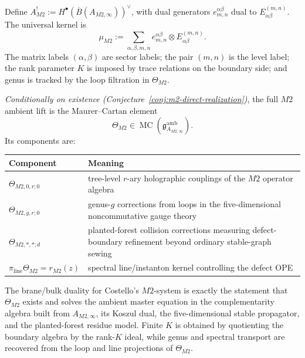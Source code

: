 \begin{definition}
\label{def:m2-koszul-dual}
Define
$A^!_{M2} := H^\bullet(\overline{B}(A_{M2,\infty}))^{\vee}$,
with dual generators $e^{\alpha\beta}_{m,n}$ dual to
$E^{(m,n)}_{\alpha\beta}$. The universal kernel is
\begin{equation}
\label{eq:m2-universal-kernel}
\mu_{M2}
:=
\sum_{\alpha,\beta,m,n}
e^{\alpha\beta}_{m,n} \otimes E^{(m,n)}_{\alpha\beta}.
\end{equation}
The matrix labels $(\alpha,\beta)$ are sector labels; the pair
$(m,n)$ is the level label; the rank parameter $K$ is imposed by
trace relations on the boundary side; and genus is tracked by the
loop filtration in $\Theta_{M2}$.
\end{definition}

\begin{definition}
\label{def:m2-master-lift}
\emph{Conditionally on existence (Conjecture~\ref{conj:m2-direct-realization})}, the full $M2$ ambient lift is the Maurer--Cartan element
\[
\Theta_{M2}
\in
\operatorname{MC}(\mathfrak{g}^{\mathrm{amb}}_{A_{M2,\infty}}).
\]
Its components are:
\begin{center}
\begin{tabular}{@{}p{}p{}@{}}
\toprule
Component & Meaning \\
\midrule
$\Theta_{M2,0,r;0}$ & tree-level $r$-ary holographic
couplings of the $M2$ operator algebra \\
$\Theta_{M2,g,r;0}$ & genus-$g$ corrections from loops in
the five-dimensional noncommutative gauge theory \\
$\Theta_{M2,\ast,\ast;d}$ & planted-forest collision
corrections measuring defect-boundary refinement beyond
ordinary stable-graph sewing \\
$\pi_{\mathrm{line}}\Theta_{M2} = r_{M2}(z)$ & spectral
line/instanton kernel controlling the defect OPE \\
\bottomrule
\end{tabular}
\end{center}
\end{definition}

\begin{conjecture}
\label{conj:m2-direct-realization}
\ClaimStatusConjectured
The brane/bulk duality for Costello's $M2$-system is exactly the
statement that $\Theta_{M2}$ exists and solves the ambient master
equation in the complementarity algebra built from
$A_{M2,\infty}$, its Koszul dual, the five-dimensional stable
propagator, and the planted-forest residue model. Finite $K$ is
obtained by quotienting the boundary algebra by the rank-$K$ ideal,
while genus and spectral transport are recovered from the loop and
line projections of $\Theta_{M2}$.
\end{conjecture}

